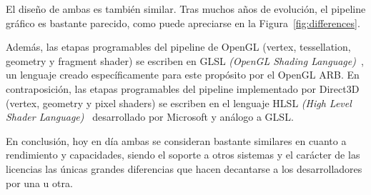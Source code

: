 El diseño de ambas es también similar. Tras muchos años de evolución, el
pipeline gráfico es bastante parecido, como puede apreciarse en la
Figura~\ref{fig:differences}.

Además, las etapas programables del pipeline de OpenGL (vertex, tessellation,
geometry y fragment shader) se escriben en GLSL \textit{(OpenGL Shading
Language)}~\cite{GLSL}, un lenguaje creado específicamente para este propósito
por el OpenGL ARB. En contraposición, las etapas programables del pipeline
implementado por Direct3D (vertex, geometry y pixel shaders) se escriben en el
lenguaje HLSL \textit{(High Level Shader Language)}~\cite{HLSL} desarrollado por
Microsoft y análogo a GLSL.

En conclusión, hoy en día ambas se consideran bastante similares en cuanto a
rendimiento y capacidades, siendo el soporte a otros sistemas y el carácter de
las licencias las únicas grandes diferencias que hacen decantarse a los
desarrolladores por una u otra.
